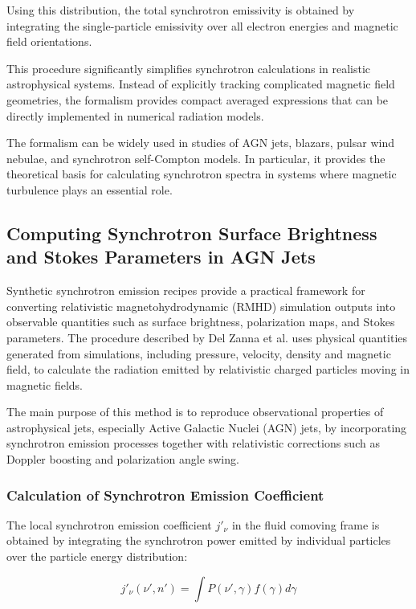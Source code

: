 \documentclass{article}
\begin{document}
Using this distribution, the total synchrotron emissivity is obtained by integrating the single-particle emissivity over all electron energies and magnetic field orientations.

This procedure significantly simplifies synchrotron calculations in realistic astrophysical systems. Instead of explicitly tracking complicated magnetic field geometries, the formalism provides compact averaged expressions that can be directly implemented in numerical radiation models.

The formalism can be widely used in studies of AGN jets, blazars, pulsar wind nebulae, and synchrotron self-Compton models. In particular, it provides the theoretical basis for calculating synchrotron spectra in systems where magnetic turbulence plays an essential role.

\subsection{Computing Synchrotron Surface Brightness and Stokes Parameters in AGN Jets}

Synthetic synchrotron emission recipes provide a practical framework for converting relativistic magnetohydrodynamic (RMHD) simulation outputs into observable quantities such as surface brightness, polarization maps, and Stokes parameters. The procedure described by Del Zanna et al. uses physical quantities generated from simulations, including pressure, velocity, density and magnetic field, to calculate the radiation emitted by relativistic charged particles moving in magnetic fields.

The main purpose of this method is to reproduce observational properties of astrophysical jets, especially Active Galactic Nuclei (AGN) jets, by incorporating synchrotron emission processes together with relativistic corrections such as Doppler boosting and polarization angle swing. 

\subsubsection{Calculation of Synchrotron Emission Coefficient}

The local synchrotron emission coefficient $j'_\nu$ in the fluid comoving frame is obtained by integrating the synchrotron power emitted by individual particles over the particle energy distribution:

\begin{equation}
j'_{\nu}(\nu',n')=\int P(\nu',\gamma)f(\gamma)d\gamma
\end{equation}
\end{document}
